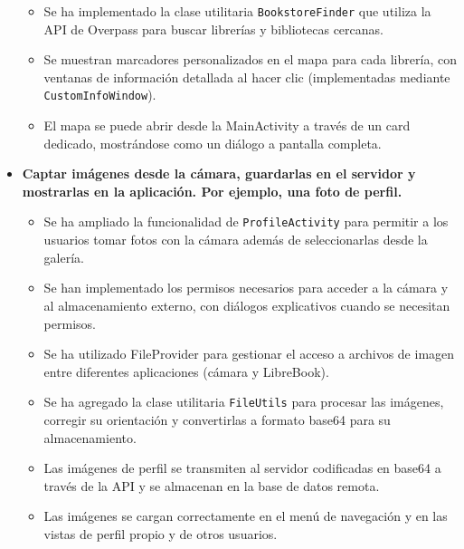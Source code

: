 \documentclass[a4paper,11pt]{report}
\begin{document}
\begin{itemize}
\begin{itemize}
            \item Se ha implementado la clase utilitaria \texttt{BookstoreFinder} que utiliza la API de Overpass para buscar librerías y bibliotecas cercanas.
            \item Se muestran marcadores personalizados en el mapa para cada librería, con ventanas de información detallada al hacer clic (implementadas mediante \texttt{CustomInfoWindow}).
            \item El mapa se puede abrir desde la MainActivity a través de un card dedicado, mostrándose como un diálogo a pantalla completa.
          \end{itemize} 
        \item \textbf{Captar imágenes desde la cámara, guardarlas en el servidor y mostrarlas en la aplicación. Por ejemplo, una foto de perfil.}
          \begin{itemize}
            \item Se ha ampliado la funcionalidad de \texttt{ProfileActivity} para permitir a los usuarios tomar fotos con la cámara además de seleccionarlas desde la galería.
            \item Se han implementado los permisos necesarios para acceder a la cámara y al almacenamiento externo, con diálogos explicativos cuando se necesitan permisos.
            \item Se ha utilizado FileProvider para gestionar el acceso a archivos de imagen entre diferentes aplicaciones (cámara y LibreBook).
            \item Se ha agregado la clase utilitaria \texttt{FileUtils} para procesar las imágenes, corregir su orientación y convertirlas a formato base64 para su almacenamiento.
            \item Las imágenes de perfil se transmiten al servidor codificadas en base64 a través de la API y se almacenan en la base de datos remota.
            \item Las imágenes se cargan correctamente en el menú de navegación y en las vistas de perfil propio y de otros usuarios.
          \end{itemize}
      \end{itemize}
\end{document}
